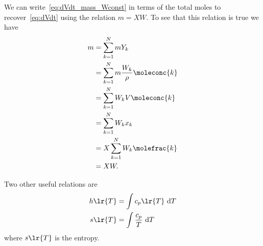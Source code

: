 We can write~\eqref{eq:dVdt_mass_Wconst} in terms of the total 
moles to recover~\eqref{eq:dVdt} using the relation $m = X W$. 
To see that this relation is true we have 
\begin{align}
  m &= \sum_{k=1}^{N}{mY_{k}} \\
    &= \sum_{k=1}^{N}{m\frac{W_{k}}{\rho}\moleconc{k}} \\
    &= \sum_{k=1}^{N}{W_{k}V\moleconc{k}} \\
    &= \sum_{k=1}^{N}{W_{k}x_{k}} \\
    &= X\sum_{k=1}^{N}{W_{k}\molefrac{k}} \\
    &= X W.
\end{align}



Two other useful relations are
\begin{align}
  h\lr{T} &= \int{c_{p}\lr{T} \ \mathrm{d}T} \label{eq:h_cp_rel} \\
  s\lr{T} &= \int{\frac{c_{p}}{T} \ \mathrm{d}T} \label{eq:s_cp_rel}
\end{align}
where $s\lr{T}$ is the entropy.




